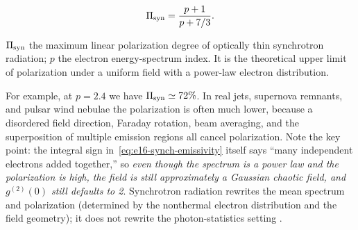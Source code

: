\begin{equation}
  \Pi_{\rm syn}=\frac{p+1}{p+7/3}.
  \label{eq:e16-synch-polarization}
\end{equation}
\begin{formulaexplain}
\(\Pi_{\rm syn}\) the maximum linear polarization degree of optically thin synchrotron radiation; \(p\) the electron energy-spectrum index. It is the theoretical upper limit of polarization under a uniform field with a power-law electron distribution.
\end{formulaexplain}
For example, at \(p=2.4\) we have \(\Pi_{\rm syn}\simeq72\%\). In real jets, supernova remnants, and pulsar wind nebulae the polarization is often much lower, because a disordered field direction, Faraday rotation, beam averaging, and the superposition of multiple emission regions all cancel polarization. Note the key point: the integral sign in~\eqref{eq:e16-synch-emissivity} itself says ``many independent electrons added together,'' so \emph{even though the spectrum is a power law and the polarization is high, the field is still approximately a Gaussian chaotic field, and \(g^{(2)}(0)\) still defaults to 2}. Synchrotron radiation rewrites the mean spectrum and polarization (determined by the nonthermal electron distribution and the field geometry); it does not rewrite the photon-statistics setting \citep{1965ARA&A...3..297G,1970RvMP...42..237B,1978bllo.conf..328B,2012ApJ...752..157Z}.


